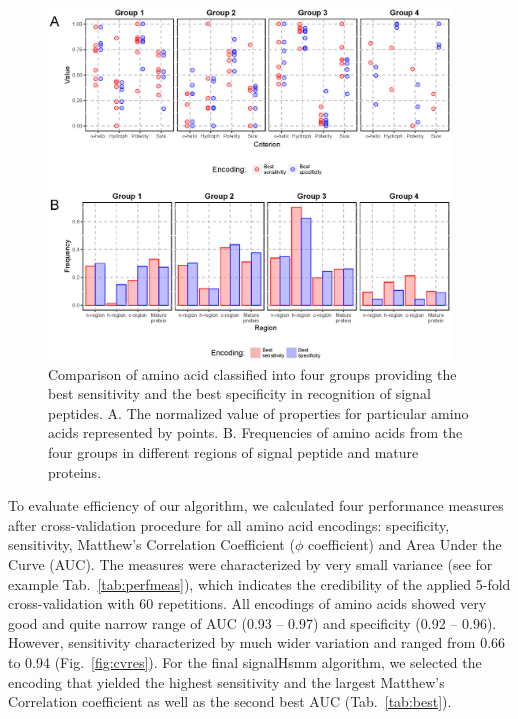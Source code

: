 \documentclass[10pt,letterpaper]{article}
\begin{document}
\begin{figure}[ht]\centering
\includegraphics[width=0.95\textwidth]{figures/enccomp.eps}
\caption{Comparison of amino acid classified into four groups providing the best sensitivity and the best specificity in recognition of signal peptides. A. The normalized value of properties for particular amino acids represented by points. B. Frequencies of amino acids from the four groups in different regions of signal peptide and mature proteins.}
\label{fig:enccomp}
\end{figure}

To evaluate efficiency of our algorithm, we calculated four performance measures after cross-validation procedure for all amino acid encodings: specificity, sensitivity, Matthew's Correlation Coefficient ($\phi$ coefficient) and Area Under the Curve (AUC). The measures were characterized by very small variance (see for example Tab.~\ref{tab:perfmeas}), which indicates the credibility of the applied 5-fold cross-validation with 60 repetitions. All encodings of amino acids showed very good and quite narrow range of AUC (0.93 -- 0.97) and specificity (0.92 -- 0.96). However, sensitivity characterized by much wider variation and ranged from 0.66 to 0.94 (Fig.~\ref{fig:cvres}). For the final signalHsmm algorithm, we selected the encoding that yielded the highest sensitivity and the largest Matthew's Correlation coefficient as well as the second best AUC (Tab.~\ref{tab:best}).
\end{document}

